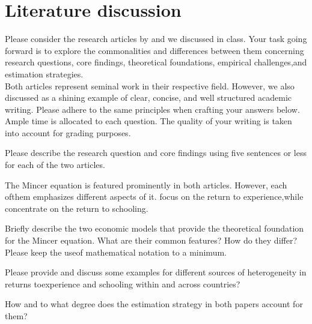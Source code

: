 \section{Literature discussion}
Please consider the research articles by \citet{Lagakos.2018} and \citet{Carneiro.2011} we discussed in class.  Your task going forward is to explore the commonalities and differences between them concerning research questions, core findings, theoretical foundations, empirical challenges,and estimation strategies. \\

Both articles represent seminal work in their respective field.  However, we also discussed \citet{Lagakos.2018} as a shining example of clear, concise, and well structured academic writing.  Please adhere to the same principles when crafting your answers below.  Ample time is allocated to each question.  The quality of your writing is taken into account for grading purposes.
\begin{boenumerate}
\item  Please describe the research question and core findings using five sentences or less for each of the two articles.
\end{boenumerate}\vspace{0.3cm}

The Mincer equation \citep{Mincer.1974} is featured prominently in both articles.  However, each ofthem emphasizes different aspects of it.  \citet{Lagakos.2018} focus on the return to experience,while \citet{Carneiro.2011} concentrate on the return to schooling.

\begin{boenumerate}
\item Briefly  describe  the  two  economic  models  that  provide  the  theoretical  foundation  for  the Mincer equation.  What are their common features?  How do they differ?  Please keep the useof mathematical notation to a minimum.
\item Please provide and discuss some examples for different sources of heterogeneity in returns toexperience and schooling within and across countries?
\item How and to what degree does the estimation strategy in both papers account for them?
\end{boenumerate}\vspace{0.3cm}
